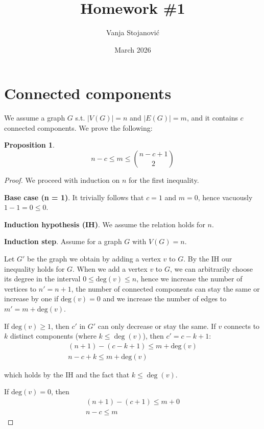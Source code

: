 \documentclass[12pt]{article}
\title{Homework \#1}
\author{Vanja Stojanovi\'c}
\date{March 2026}
\theoremstyle{definition}
\newtheorem{proposition}[theorem]{Proposition}
\begin{document}
\maketitle

\section{Connected components}

We assume a graph $G$ s.t. $|V(G)| = n$ and $|E(G)| = m$, and it contains $c$ connected components. We prove the following:

\begin{proposition}
  \[
    n - c \leq m \leq \binom{n-c+1}{2}
  \]
\end{proposition}

\begin{proof}
  We proceed with induction on $n$ for the first inequality.

  \noindent
  \textbf{Base case (n = 1)}. It trivially follows that $c = 1$ and $m=0$, hence vacuously $1 - 1 = 0 \leq 0$.

  \noindent
  \textbf{Induction hypothesis (IH)}. We assume the relation holds for $n$.

  \noindent
  \textbf{Induction step}. Assume for a graph $G$ with $V(G) = n$.

  Let $G'$ be the graph we obtain by adding a vertex $v$ to $G$. By the IH our inequality holds for $G$. When we add a vertex $v$ to $G$, we can arbitrarily choose its degree in the interval $0 \leq \text{deg}(v) \leq n$, hence we increase the number of vertices to $n' = n + 1$, the number of connected components can stay the same or increase by one if $\text{deg}(v) = 0$ and we increase the number of edges to $m' = m + \text{deg}(v)$.

  \noindent
  If $\text{deg}(v) \geq 1$, then $c'$ in $G'$ can only decrease or stay the same. If $v$ connects to $k$ distinct components (where $k \leq \deg(v)$), then $c' = c - k + 1$:
  \begin{gather}
    (n + 1) - (c - k + 1) \leq m + \text{deg}(v)\\
    n - c + k \leq m + \text{deg}(v)
  \end{gather}

  \noindent
  which holds by the IH and the fact that  $k \leq \deg(v)$.

  \noindent
  If $\text{deg}(v) = 0$, then
  \begin{gather}
    (n + 1) - (c + 1) \leq m + 0\\
    n - c \leq m
  \end{gather}


\end{proof}
\end{document}
